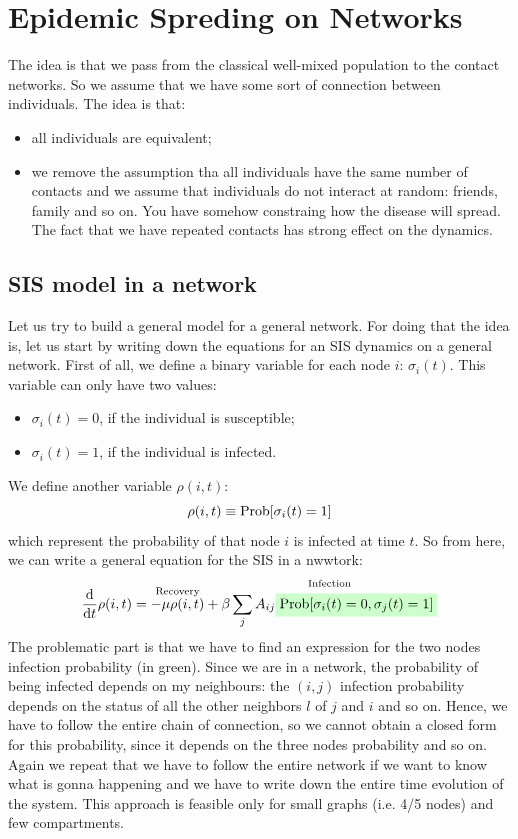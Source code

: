 \documentclass[../main/main.tex]{subfiles}
\begin{document}
\chapter{Epidemic Spreding on Networks}

The idea is that we pass from the classical well-mixed population to the contact networks. So we assume that we have some sort of connection between individuals. The idea is that:
\begin{itemize}
\item all individuals are equivalent;
\item we remove the assumption tha all individuals have the same number of contacts and we assume that individuals do not interact at random: friends, family and so on. You have somehow constraing how the disease will spread. The fact that we have repeated contacts has strong effect on the dynamics.
\end{itemize}

\section{SIS model in a network}
Let us try to build a general model for a general network. For doing that the idea is, let us start by writing down the equations for an SIS dynamics on a general network. First of all, we define a binary variable for each node \( i \): \( \sigma _i (t) \). This variable can only have two values:
\begin{itemize}
\item \( \sigma _i (t) = 0 \), if the individual is susceptible;
\item \( \sigma _i (t) = 1 \), if the individual is infected.
\end{itemize}
We define another variable \( \rho (i,t) \):
\begin{equation*}
  \rho (i,t) \equiv \text{Prob} \qty[\sigma _i (t) = 1]
\end{equation*}
which represent the probability of that node \( i \) is infected at time \( t \).
So from here, we can write a general equation for the SIS in a nwwtork:
\begin{equation}
  \dv{}{t} \rho (i,t) = \overset{\text{Recovery}}{- \mu  \rho (i,t)} + \overset{\text{Infection}}{\beta \sum_{j}^{} A_{ij} \mathcolorbox{green!20}{\text{Prob} [\sigma _i (t) = 0, \sigma _j (t ) =1 ]   }}
\end{equation}
The problematic part is that we have to find an expression for the two nodes infection probability (in green). Since we are in a network, the probability of being infected depends on my neighbours: the \( (i,j) \) infection probability depends on the status of all the other neighbors \( l \) of \( j \) and \( i \) and so on.
Hence, we have to follow the entire chain of connection, so we cannot obtain a closed form for this probability, since it depends on the three nodes probability and so on.
Again we repeat that we have to follow the entire network if we want to know what is gonna happening and we have to write down the entire time evolution of the system. This approach is feasible only for small graphs (i.e. 4/5 nodes) and few compartments.
\end{document}
